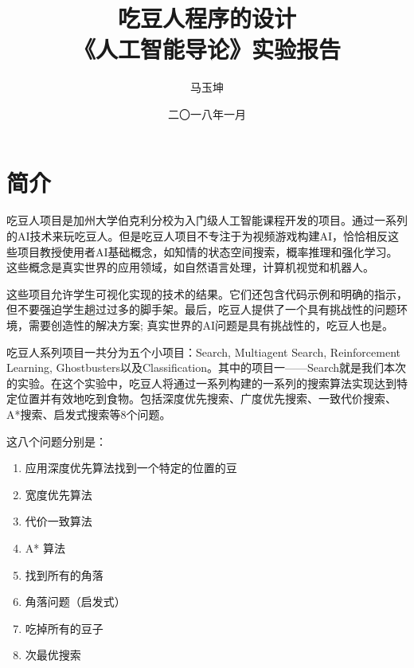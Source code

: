 \documentclass[forprint]{WHUBachelor}
\begin{document}

\title{吃豆人程序的设计 \\ {\Large《人工智能导论》实验报告}}
\author{马玉坤}                            %
\date{二〇一八年一月}                    %

\maketitle
\frontmatter
{}              %
\tableofcontents
\mainmatter %

\chapter{简介}

吃豆人项目\cite{berkeley}是加州大学伯克利分校为入门级人工智能课程开发的项目。通过一系列的AI技术来玩吃豆人。但是吃豆人项目不专注于为视频游戏构建AI，恰恰相反这些项目教授使用者AI基础概念，如知情的状态空间搜索，概率推理和强化学习。这些概念是真实世界的应用领域，如自然语言处理，计算机视觉和机器人。

这些项目允许学生可视化实现的技术的结果。它们还包含代码示例和明确的指示，但不要强迫学生趟过过多的脚手架。最后，吃豆人提供了一个具有挑战性的问题环境，需要创造性的解决方案; 真实世界的AI问题是具有挑战性的，吃豆人也是。

吃豆人系列项目一共分为五个小项目：Search, Multiagent Search, Reinforcement Learning, Ghostbusters以及Classification。其中的项目一——Search就是我们本次的实验。在这个实验中，吃豆人将通过一系列构建的一系列的搜索算法实现达到特定位置并有效地吃到食物。包括深度优先搜索、广度优先搜索、一致代价搜索、A*搜索、启发式搜索等8个问题。

这八个问题分别是：

\begin{enumerate}
\item 应用深度优先算法找到一个特定的位置的豆
\item 宽度优先算法
\item 代价一致算法
\item A* 算法
\item 找到所有的角落
\item 角落问题（启发式）
\item 吃掉所有的豆子
\item 次最优搜索
\end{enumerate}
\end{document}
